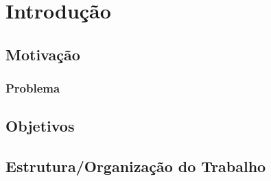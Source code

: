 \documentclass[
  12pt,       	%
  openright,    %
  oneside,      %
  a4paper,      %
  chapter=Title,   %
  section=Title,   %
  subsection=Title,  %
  subsubsection=Title,%
  english,      %
  french,        %
  spanish,     %
  brazil        %
  ]{abntex2-deelt-v1}
\begin{document}
\listoftables*
\cleardoublepage



\tableofcontents*
\cleardoublepage

\textual
\chapter{Introdução}
\par



\section{Motivação}

\subsection{Problema}

\section{Objetivos}
\par

	
\section{Estrutura/Organização  do Trabalho}
\par
\end{document}
